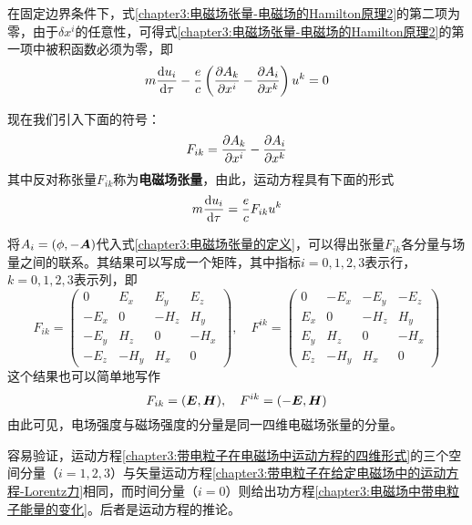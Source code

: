 在固定边界条件下，式\eqref{chapter3:电磁场张量-电磁场的Hamilton原理2}的第二项为零，由于$\delta x^i$的任意性，可得式\eqref{chapter3:电磁场张量-电磁场的Hamilton原理2}的第一项中被积函数必须为零，即
\begin{equation*}
	m\frac{\mathrm{d} u_i}{\mathrm{d} \tau} - \frac{e}{c}\left(\frac{\partial A_k}{\partial x^i} - \frac{\partial A_i}{\partial x^k}\right) u^k = 0
\end{equation*}

现在我们引入下面的符号：
\begin{equation}
	F_{ik} = \frac{\partial A_k}{\partial x^i} - \frac{\partial A_i}{\partial x^k}
	\label{chapter3:电磁场张量的定义}
\end{equation}
其中反对称张量$F_{ik}$称为{\bf 电磁场张量}，由此，运动方程具有下面的形式
\begin{equation}
	m\frac{\mathrm{d} u_i}{\mathrm{d} \tau} = \frac{e}{c}F_{ik}u^k
	\label{chapter3:带电粒子在电磁场中运动方程的四维形式}
\end{equation}

将$A_i=(\phi,-\boldsymbol{A})$代入式\eqref{chapter3:电磁场张量的定义}，可以得出张量$F_{ik}$各分量与场量之间的联系。其结果可以写成一个矩阵，其中指标$i=0,1,2,3$表示行，$k=0,1,2,3$表示列，即
\begin{equation}
	F_{ik} = \begin{pmatrix} 0 & E_x & E_y & E_z \\
							-E_x & 0 & -H_z & H_y \\
							-E_y & H_z & 0 & -H_x \\
							-E_z & -H_y & H_x & 0 \end{pmatrix},\quad
	F^{ik} = \begin{pmatrix} 0 & -E_x & -E_y & -E_z \\
							E_x & 0 & -H_z & H_y \\
							E_y & H_z & 0 & -H_x \\
							E_z & -H_y & H_x & 0 \end{pmatrix}
	\label{chapter3:电磁场张量的分量形式}
\end{equation}
这个结果也可以简单地写作
\begin{equation}
	F_{ik} = (\boldsymbol{E},\boldsymbol{H}),\quad F^{ik} = (-\boldsymbol{E},\boldsymbol{H})
\end{equation}
由此可见，电场强度与磁场强度的分量是同一四维电磁场张量的分量。

容易验证，运动方程\eqref{chapter3:带电粒子在电磁场中运动方程的四维形式}的三个空间分量（$i=1,2,3$）与矢量运动方程\eqref{chapter3:带电粒子在给定电磁场中的运动方程-Lorentz力}相同，而时间分量（$i=0$）则给出功方程\eqref{chapter3:电磁场中带电粒子能量的变化}。后者是运动方程的推论。

